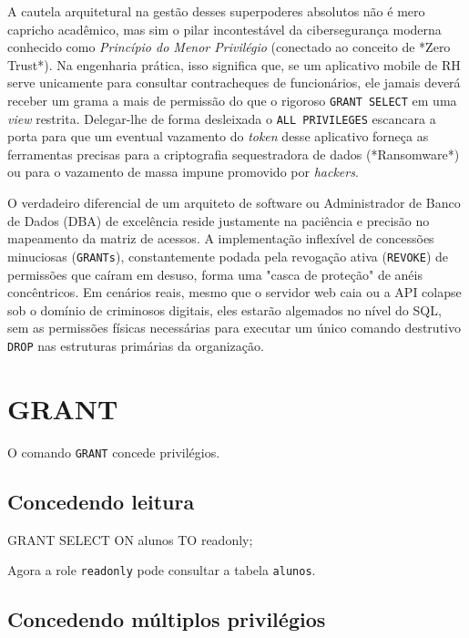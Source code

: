 A cautela arquitetural na gestão desses superpoderes absolutos não é mero capricho acadêmico, mas sim o pilar incontestável da cibersegurança moderna conhecido como \textit{Princípio do Menor Privilégio} (conectado ao conceito de *Zero Trust*). Na engenharia prática, isso significa que, se um aplicativo mobile de RH serve unicamente para consultar contracheques de funcionários, ele jamais deverá receber um grama a mais de permissão do que o rigoroso \texttt{GRANT SELECT} em uma \textit{view} restrita. Delegar-lhe de forma desleixada o \texttt{ALL PRIVILEGES} escancara a porta para que um eventual vazamento do \textit{token} desse aplicativo forneça as ferramentas precisas para a criptografia sequestradora de dados (*Ransomware*) ou para o vazamento de massa impune promovido por \textit{hackers}.

O verdadeiro diferencial de um arquiteto de software ou Administrador de Banco de Dados (DBA) de excelência reside justamente na paciência e precisão no mapeamento da matriz de acessos. A implementação inflexível de concessões minuciosas (\texttt{GRANTs}), constantemente podada pela revogação ativa (\texttt{REVOKE}) de permissões que caíram em desuso, forma uma "casca de proteção" de anéis concêntricos. Em cenários reais, mesmo que o servidor web caia ou a API colapse sob o domínio de criminosos digitais, eles estarão algemados no nível do SQL, sem as permissões físicas necessárias para executar um único comando destrutivo \texttt{DROP} nas estruturas primárias da organização.

\section{GRANT}

O comando \texttt{GRANT} concede privilégios.

\subsection{Concedendo leitura}

\begin{sqlcode}
GRANT SELECT ON alunos TO readonly;
\end{sqlcode}

Agora a role \texttt{readonly} pode consultar a tabela \texttt{alunos}.

\subsection{Concedendo múltiplos privilégios}

